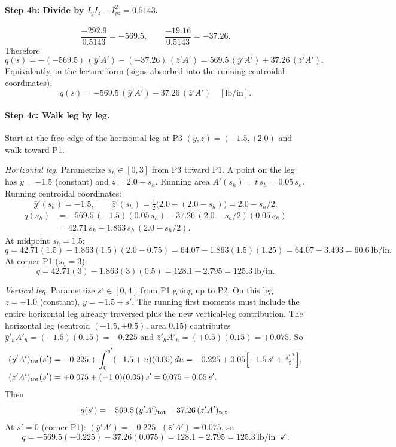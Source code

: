 \documentclass[11pt]{article}
\begin{document}
\paragraph{Step 4b: Divide by $I_y I_z - I_{yz}^2 = 0.5143$.}
\[
\frac{-292.9}{0.5143} = -569.5,\qquad \frac{-19.16}{0.5143} = -37.26.
\]
Therefore
\[
q(s) = -(-569.5)\,(\bar y' A') - (-37.26)\,(\bar z' A') = 569.5\,(\bar y' A') + 37.26\,(\bar z' A').
\]
Equivalently, in the lecture form (signs absorbed into the running centroidal coordinates),
\[
q(s) = -569.5\,(\bar y' A') - 37.26\,(\bar z' A')\quad[\text{lb/in}].
\]

\paragraph{Step 4c: Walk leg by leg.} Start at the free edge of the horizontal leg at P3 $(y,z) = (-1.5, +2.0)$ and walk toward P1.

\emph{Horizontal leg.} Parametrize $s_h \in [0,3]$ from P3 toward P1. A point on the leg has $y = -1.5$ (constant) and $z = 2.0 - s_h$. Running area $A'(s_h) = t\,s_h = 0.05\,s_h$. Running centroidal coordinates:
\[
\bar y'(s_h) = -1.5,\qquad \bar z'(s_h) = \tfrac{1}{2}\bigl(2.0 + (2.0 - s_h)\bigr) = 2.0 - s_h/2.
\]
\begin{align*}
q(s_h) &= -569.5\,(-1.5)(0.05\,s_h) - 37.26\,(2.0 - s_h/2)(0.05\,s_h)\\
&= 42.71\,s_h - 1.863\,s_h\,(2.0 - s_h/2).
\end{align*}
At midpoint $s_h = 1.5$:
\[
q = 42.71(1.5) - 1.863(1.5)(2.0 - 0.75) = 64.07 - 1.863(1.5)(1.25) = 64.07 - 3.493 = 60.6\ \text{lb/in}.
\]
At corner P1 ($s_h = 3$):
\[
q = 42.71(3) - 1.863(3)(0.5) = 128.1 - 2.795 = 125.3\ \text{lb/in}.
\]

\emph{Vertical leg.} Parametrize $s' \in [0,4]$ from P1 going up to P2. On this leg $z = -1.0$ (constant), $y = -1.5 + s'$. The running first moments must include the entire horizontal leg already traversed plus the new vertical-leg contribution. The horizontal leg (centroid $(-1.5,+0.5)$, area $0.15$) contributes $\bar y'_h A'_h = (-1.5)(0.15) = -0.225$ and $\bar z'_h A'_h = (+0.5)(0.15) = +0.075$. So
\begin{align*}
(\bar y' A')_{\rm tot}(s') &= -0.225 + \int_0^{s'}(-1.5 + u)(0.05)\,du = -0.225 + 0.05\Bigl[-1.5\,s' + \tfrac{s'^{\,2}}{2}\Bigr],\\
(\bar z' A')_{\rm tot}(s') &= +0.075 + (-1.0)(0.05)\,s' = 0.075 - 0.05\,s'.
\end{align*}
Then
\[
q(s') = -569.5\,(\bar y' A')_{\rm tot} - 37.26\,(\bar z' A')_{\rm tot}.
\]
At $s' = 0$ (corner P1): $(\bar y' A') = -0.225$, $(\bar z' A') = 0.075$, so
\[
q = -569.5(-0.225) - 37.26(0.075) = 128.1 - 2.795 = 125.3\ \text{lb/in}\;\;\checkmark.
\]
\end{document}
